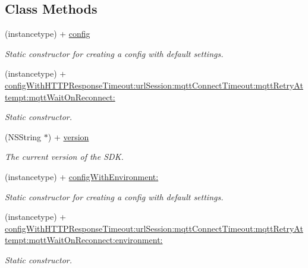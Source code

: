 \subsection*{Class Methods}
\begin{DoxyCompactItemize}
\item 
(instancetype) + \hyperlink{class_x_i_sdk_config_a7fed9db56ae4a91646296d35c6cb25b5}{config}
\begin{DoxyCompactList}\small\item\em Static constructor for creating a config with default settings. \end{DoxyCompactList}\item 
(instancetype) + \hyperlink{class_x_i_sdk_config_ad84b287f2b68f614ffa522dfab020af3}{config\+With\+H\+T\+T\+P\+Response\+Timeout\+:url\+Session\+:mqtt\+Connect\+Timeout\+:mqtt\+Retry\+Attempt\+:mqtt\+Wait\+On\+Reconnect\+:}
\begin{DoxyCompactList}\small\item\em Static constructor. \end{DoxyCompactList}\item 
(N\+S\+String $\ast$) + \hyperlink{class_x_i_sdk_config_af8943df70be2f22a5c1937b9ec7d961b}{version}
\begin{DoxyCompactList}\small\item\em The current version of the S\+DK. \end{DoxyCompactList}\item 
(instancetype) + \hyperlink{class_x_i_sdk_config_afa1234314350e4363b3540809540812b}{config\+With\+Environment\+:}
\begin{DoxyCompactList}\small\item\em Static constructor for creating a config with default settings. \end{DoxyCompactList}\item 
(instancetype) + \hyperlink{class_x_i_sdk_config_a01ace5ad13ef869398e87b9413dab6e3}{config\+With\+H\+T\+T\+P\+Response\+Timeout\+:url\+Session\+:mqtt\+Connect\+Timeout\+:mqtt\+Retry\+Attempt\+:mqtt\+Wait\+On\+Reconnect\+:environment\+:}
\begin{DoxyCompactList}\small\item\em Static constructor. \end{DoxyCompactList}\end{DoxyCompactItemize}
